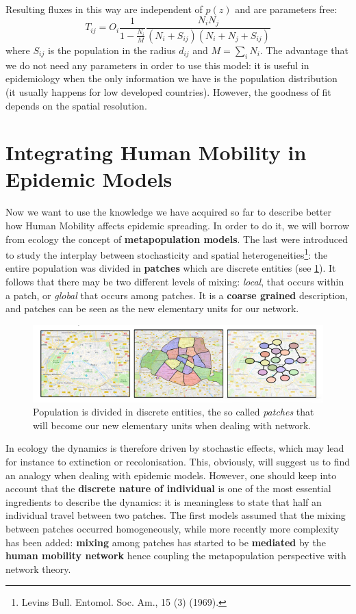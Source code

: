 \documentclass[../main/main.tex]{subfiles}
\begin{document}
Resulting fluxes in this way are independent of $p(z)$ and are parameters free:
\begin{equation}
    T_{ij} = O_i \frac{1}{1-\frac{N_i}{M}}\frac{N_i N_j}{(N_i+S_{ij})(N_i+N_j+S_{ij})}
\end{equation}
where $S_{ij}$ is the population in the radius $d_{ij}$ and $M = \sum_i N_i$. The advantage that we do not need any parameters in order to use this model: it is useful in epidemiology when the only information we have is the population distribution (it usually happens for low developed countries). However, the goodness of fit depends on the spatial resolution.



\section{Integrating Human Mobility in Epidemic Models}

Now we want to use the knowledge we have acquired so far to describe better how Human Mobility affects epidemic spreading. In order to do it, we will borrow from ecology the concept of \textbf{metapopulation models}. The last were introduced to study the interplay between stochasticity and spatial heterogeneities\footnote{Levins Bull. Entomol. Soc. Am., 15 (3) (1969).}: the entire population was divided in \textbf{patches} which are discrete entities (see \ref{fig:13_05}). It follows that there may be two different levels of mixing: \textit{local}, that occurs within a patch, or \textit{global} that occurs among patches. It is a \textbf{coarse grained} description, and patches can be seen as the new elementary units for our network.

\begin{figure}[h!]
\centering
\includegraphics[width=1\textwidth]{../lessons/image/14/image05.png}
\caption{\label{fig:13_05} Population is divided in discrete entities, the so called \textit{patches} that will become our new elementary units when dealing with network.}
\end{figure}

In ecology the dynamics is therefore driven by stochastic effects, which may lead for instance to extinction or recolonisation. This, obviously, will suggest us to find an analogy when dealing with epidemic models. However, one should keep into account that the \textbf{discrete nature of individual} is one of the most essential ingredients to describe the dynamics: it is meaningless to state that half an individual travel between two patches. The first models assumed that the mixing between patches occurred homogeneously, while more recently more complexity has been added: \textbf{mixing} among patches has started to be \textbf{mediated} by the \textbf{human mobility network} hence coupling the metapopulation perspective with network theory.
\end{document}
